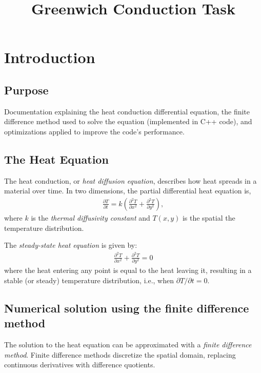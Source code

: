 \documentclass[11pt,a4paper]{article}
\title{Greenwich Conduction Task}
\begin{document}
\maketitle
\newpage

\tableofcontents %
\newpage

\section{Introduction}

\subsection{Purpose}

Documentation explaining the heat conduction differential equation,
the finite difference method used to solve the equation (implemented in C++ code),
and optimizations applied to improve the code's performance.

\subsection{The Heat Equation}

The heat conduction, or \emph{heat diffusion equation}, describes how
heat spreads in a material over time. In two dimensions,
the partial differential heat equation is,
\begin{align}
  \frac{\partial T}{\partial t} =
  k \left(\frac{\partial^2 T}{\partial x^2} +
  \frac{\partial^2 T}{\partial y^2}\right),
\end{align}
where \(k\) is the \emph{thermal diffusivity constant} and
\(T(x,y)\) is the spatial the temperature distribution.

The \emph{steady-state heat equation} is given by:
\begin{align}
  \frac{\partial^2 T}{\partial x^2} + \frac{\partial^2 T}{\partial y^2} = 0
\end{align}
where the heat entering any point is equal to the heat leaving it,
resulting in a stable (or steady) temperature distribution,
i.e., when \(\partial T / \partial t = 0\).

\subsection{Numerical solution using the finite difference method}

The solution to the heat equation
can be approximated with a \emph{finite difference method}.
Finite difference methods discretize the spatial domain,
replacing continuous derivatives with difference quotients.
\end{document}

